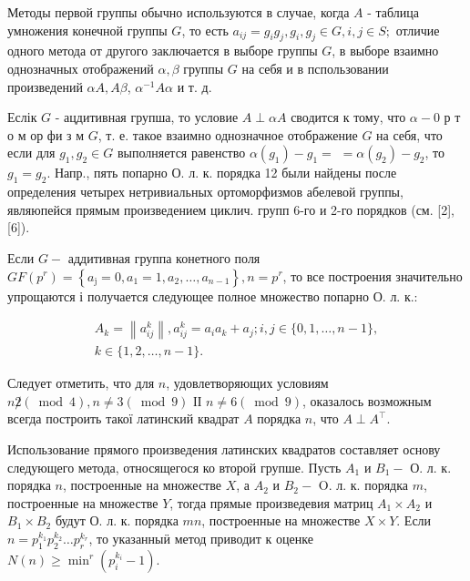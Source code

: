 \documentclass[10pt]{article}
\begin{document}
Методы первой группы обычно используются в случае, когда $A$ - таблица умножения конечной группы $G$, то есть $a_{i j}=g_{i} g_{j}, g_{i}, g_{j} \in G, i, j \in S ;$ отличие одного метода от другого заключается в выборе группы $G$, в выборе взаимно однозначных отображений $\alpha, \beta$ группы $G$ на себя и в пспользовании произведений $\alpha A, A \beta$, $\alpha^{-1} A \alpha$ и т. д.



Еслік $G$ - ацдитивная групша, то условие $A \perp \alpha A$ сводится к тому, что $\alpha-0$ р т о м ор фи з м $G$, т. е. такое взаимно однозначное отображение $G$ на себя, что если для $g_{1}, g_{2} \in G$ выполняется равенство $\alpha\left(g_{1}\right)-g_{1}=$ $=\alpha\left(g_{2}\right)-g_{2}$, то $g_{1}=g_{2}$. Напр., пять попарно О. л. к. порядка 12 были найдены после определения четырех нетривиальных ортоморфизмов абелевой группы, являюпейся прямым произведением циклич. групп 6-го и 2-го порядков (см. [2], [6]).



Если $G-$ аддитивная группа конетного поля $G F\left(p^{r}\right)=\left\{a_{\mathrm{j}}=0, a_{1}=1, a_{2}, \ldots, a_{n-1}\right\}, n=p^{r}$, то все построения значительно упрощаются і получается следующее полное множество попарно О. л. к.:



\[

\begin{gathered}

A_{k}=\left\|a_{i j}^{k}\right\|, a_{i j}^{k}=a_{i} a_{k}+a_{j} ; i, j \in\{0,1, \ldots, n-1\}, \\

k \in\{1,2, \ldots, n-1\} .

\end{gathered}

\]



Следует отметить, что для $n$, удовлетворяющих условиям $n \not 2(\bmod 4), n \neq 3(\bmod 9)$ ІІ $n \neq 6(\bmod 9)$, оказалось возможным всегда построить такої латинский квадрат $A$ порядка $n$, что $A \perp A^{\top}$.



Использование прямого произведения латинских квадратов составляет основу следующего метода, относящегося ко второй групше. Пусть $A_{1}$ и $B_{1}-$ О. л. к. порядка $n$, построенные на множестве $X$, а $A_{2}$ и $B_{2}-$ O. л. к. порядка $m$, построенные на множестве $Y$, тогда прямые произведевия матриц $A_{1} \times A_{2}$ и $B_{1} \times B_{2}$ будут О. л. к. порядка $m n$, построенные на множестве $X \times Y$. Если $n=p_{1}^{k_{1}} p_{2}^{k_{2}} \ldots p_{r}^{k_{r}}$, то указанныӥ метод приводит к оценке $N(n) \geqslant \min ^{r}\left(p_{i}^{k_{i}}-1\right)$.
\end{document}
